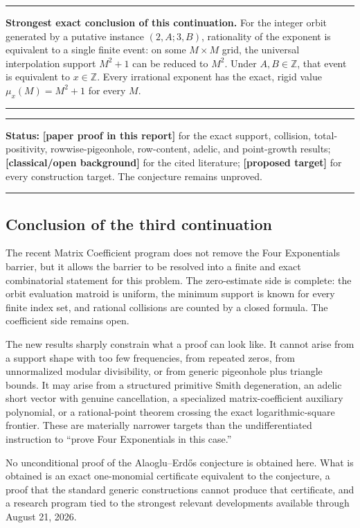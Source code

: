 \documentclass[11pt,oneside]{article}
\theoremstyle{definition}
\theoremstyle{remark}
\newcommand{\Z}{\mathbb Z}
\newcommand{\statusnew}{\textcolor{newgreen}{\textbf{[paper proof in this report]}}}
\newcommand{\statusknown}{\textcolor{classicalgray}{\textbf{[classical/\allowbreak open background]}}}
\newcommand{\statusopen}{\textcolor{classicalgray}{\textbf{[proposed target]}}}
\newenvironment{statusbox}[1]
{\begin{center}\begin{minipage}{0.94\textwidth}\raggedright\hbadness=10000\hrule
\vspace{0.45em}\textbf{Status:} #1\par\vspace{0.35em}}
{\vspace{0.35em}\hrule\end{minipage}\end{center}}
\newenvironment{resultbox}
{\begin{center}\begin{minipage}{0.94\textwidth}\hrule\vspace{0.45em}}
{\vspace{0.35em}\hrule\end{minipage}\end{center}}
\begin{document}
\begin{resultbox}
\textbf{Strongest exact conclusion of this continuation.}
For the integer orbit generated by a putative instance $(2,A;3,B)$, rationality of the
exponent is equivalent to a single finite event: on some $M\times M$ grid, the universal
interpolation support $M^2+1$ can be reduced to $M^2$.  Under $A,B\in\Z$, that event is
equivalent to $x\in\Z$.  Every irrational exponent has the exact, rigid value
$\mu_x(M)=M^2+1$ for every $M$.
\end{resultbox}

\begin{statusbox}{\statusnew{} for the exact support, collision, total-positivity,
rowwise-pigeonhole, row-content, adelic, and point-growth results; \statusknown{} for the
cited literature; \statusopen{} for every construction target.  The conjecture remains
unproved.}
\end{statusbox}

\subsection{Conclusion of the third continuation}
\label{sec:sparse-conclusion}

The recent Matrix Coefficient program does not remove the Four Exponentials barrier, but it
allows the barrier to be resolved into a finite and exact combinatorial statement for this
problem.  The zero-estimate side is complete: the orbit evaluation matroid is uniform, the
minimum support is known for every finite index set, and rational collisions are counted by a
closed formula.  The coefficient side remains open.

The new results sharply constrain what a proof can look like.  It cannot arise from a support
shape with too few frequencies, from repeated zeros, from unnormalized modular divisibility,
or from generic pigeonhole plus triangle bounds.  It may arise from a structured primitive
Smith degeneration, an adelic short vector with genuine cancellation, a specialized
matrix-coefficient auxiliary polynomial, or a rational-point theorem crossing the exact
logarithmic-square frontier.  These are materially narrower targets than the undifferentiated
instruction to ``prove Four Exponentials in this case.''

No unconditional proof of the Alaoglu--Erd\H{o}s conjecture is obtained here.  What is
obtained is an exact one-monomial certificate equivalent to the conjecture, a proof that the
standard generic constructions cannot produce that certificate, and a research program tied
to the strongest relevant developments available through August 21, 2026.
\end{document}
